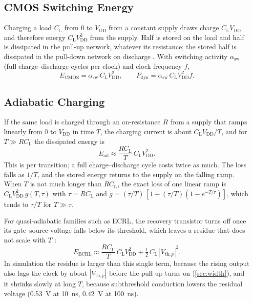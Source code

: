 \documentclass[conference]{IEEEtran}
\newcommand{\VDD}{V_{\mathrm{DD}}}
\newcommand{\CL}{C_{\mathrm{L}}}
\begin{document}
\subsection{CMOS Switching Energy}
Charging a load $\CL$ from $0$ to $\VDD$ from a constant supply draws charge
$\CL\VDD$ and therefore energy $\CL\VDD^2$ from the supply. Half is stored on
the load and half is dissipated in the pull-up network, whatever its
resistance; the stored half is dissipated in the pull-down network on
discharge \cite{rabaey2003}. With switching activity $\alpha_{\mathrm{sw}}$
(full charge--discharge cycles per clock) and clock frequency $f$,
\begin{equation}
  E_{\mathrm{CMOS}} = \alpha_{\mathrm{sw}}\,\CL\VDD^2, \qquad
  P_{\mathrm{dyn}} = \alpha_{\mathrm{sw}}\,\CL\VDD^2 f .
  \label{eq:cmos}
\end{equation}

\subsection{Adiabatic Charging}
\label{sec:adiabatic}
If the same load is charged through an on-resistance $R$ from a supply that
ramps linearly from $0$ to $\VDD$ in time $T$, the charging current is about
$\CL\VDD/T$, and for $T \gg R\CL$ the dissipated energy is
\cite{athas1994,fischer2004}
\begin{equation}
  E_{\mathrm{ad}} \approx \frac{R\CL}{T}\,\CL\VDD^2 .
  \label{eq:adiabatic}
\end{equation}
This is per transition; a full charge--discharge cycle costs twice as much.
The loss falls as $1/T$, and the stored energy returns to the supply on the
falling ramp. When $T$ is not much longer than $R\CL$, the exact loss of one
linear ramp is $\CL\VDD^2\,g(T,\tau)$ with $\tau=R\CL$ and
$g=(\tau/T)\,[1-(\tau/T)(1-e^{-T/\tau})]$, which tends to $\tau/T$ for
$T\gg\tau$.

For quasi-adiabatic families such as ECRL, the recovery transistor turns off
once its gate--source voltage falls below its threshold, which leaves a
residue that does not scale with $T$ \cite{moon1996,fischer2004}:
\begin{equation}
  E_{\mathrm{ECRL}} \approx \frac{R\CL}{T}\,\CL\VDD^2
  + \tfrac12\,\CL\,|V_{\mathrm{th},p}|^2 .
  \label{eq:ecrl}
\end{equation}
In simulation the residue is larger than this single term, because the
rising output also lags the clock by about $|V_{\mathrm{th},p}|$ before the
pull-up turns on (\cref{sec:width}), and it shrinks slowly at long $T$,
because subthreshold conduction lowers the residual voltage (0.53~V at
10~ns, 0.42~V at 100~ns).
\end{document}
